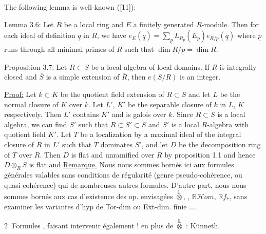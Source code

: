 The following lemma is well-known ([11]):

Lemma 3.6: Let $R$ be a local ring and $E$ a finitely generated $R$-module. Then for each ideal of definition $\underline q$ in $R$, we have $e_E(\underline q)=\sum_{\underline p}L_{R_{\underline p}}(E_{\underline p})e_{R/\underline p}(\underline q)$ where $\underline p$ runs through all minimal primes of $R$ such that $\dim R/\underline p=\dim R$.

Proposition 3.7: Let $R\subset S$ be a local algebra of local domains. If $R$ is integrally closed and $\overline S$ is a simple extension of $\overline R$, then $e(S/R)$ is an integer.

\uline{Proof:} Let $k\subset K$ be the quotient field extension of $R\subset S$ and let $L$ be the normal closure of $K$ over $k$. Let $L'$, $K'$ be the separable closure of $k$ in $L$, $K$ respectively. Then $L'$ contains $K'$ and is galois over $k$. Since $R\subset S$ is a local algebra, we can find $S'$ such that $R\subset S'\subset S$ and $S'$ is a local $R$-algebra with quotient field $K'$. Let $T$ be a localization by a maximal ideal of the integral closure of $R$ in $L'$ such that $T$ dominates $S'$, and let $D$ be the decomposition ring of $T$ over $R$. Then $D$ is flat and unramified over $R$ by proposition 1.1 and hence $D\otimes_R S$ is flat and
\uline{Remarque.} Nous nous sommes bornés ici aux formules générales valables sans conditions de régularité (genre pseudo-cohérence, ou quasi-cohérence) qui  de nombreuses autres formules. D'autre part, nous nous sommes bornés aux cas d'existence  des op. envisagées $\overset{\mathbb L}{\otimes}$, , $\mathbb R\mathcal Hom$, $\mathbb Rf_*$, sans examiner les variantes  d'hyp de Tor-dim ou Ext-dim. finie ....


\textcircled{2} Formules , faisant intervenir également $!$ en plus de $\overset{\mathbb L}{\otimes}$ : Künneth.


